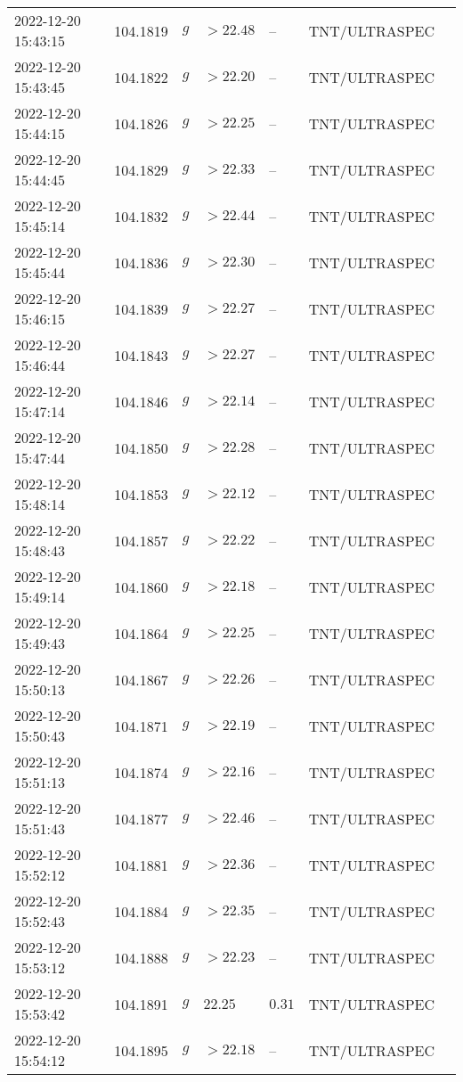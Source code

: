 \documentclass{nature_plusfigure}
\begin{document}
\begin{supplement}
\begin{center}
\begin{longtable}{lllllll}
2022-12-20 15:43:15 & 104.1819 & $g$ & $>22.48$ & -- & TNT/ULTRASPEC &  \\ 
2022-12-20 15:43:45 & 104.1822 & $g$ & $>22.20$ & -- & TNT/ULTRASPEC &  \\ 
2022-12-20 15:44:15 & 104.1826 & $g$ & $>22.25$ & -- & TNT/ULTRASPEC &  \\ 
2022-12-20 15:44:45 & 104.1829 & $g$ & $>22.33$ & -- & TNT/ULTRASPEC &  \\ 
2022-12-20 15:45:14 & 104.1832 & $g$ & $>22.44$ & -- & TNT/ULTRASPEC &  \\ 
2022-12-20 15:45:44 & 104.1836 & $g$ & $>22.30$ & -- & TNT/ULTRASPEC &  \\ 
2022-12-20 15:46:15 & 104.1839 & $g$ & $>22.27$ & -- & TNT/ULTRASPEC &  \\ 
2022-12-20 15:46:44 & 104.1843 & $g$ & $>22.27$ & -- & TNT/ULTRASPEC &  \\ 
2022-12-20 15:47:14 & 104.1846 & $g$ & $>22.14$ & -- & TNT/ULTRASPEC &  \\ 
2022-12-20 15:47:44 & 104.1850 & $g$ & $>22.28$ & -- & TNT/ULTRASPEC &  \\ 
2022-12-20 15:48:14 & 104.1853 & $g$ & $>22.12$ & -- & TNT/ULTRASPEC &  \\ 
2022-12-20 15:48:43 & 104.1857 & $g$ & $>22.22$ & -- & TNT/ULTRASPEC &  \\ 
2022-12-20 15:49:14 & 104.1860 & $g$ & $>22.18$ & -- & TNT/ULTRASPEC &  \\ 
2022-12-20 15:49:43 & 104.1864 & $g$ & $>22.25$ & -- & TNT/ULTRASPEC &  \\ 
2022-12-20 15:50:13 & 104.1867 & $g$ & $>22.26$ & -- & TNT/ULTRASPEC &  \\ 
2022-12-20 15:50:43 & 104.1871 & $g$ & $>22.19$ & -- & TNT/ULTRASPEC &  \\ 
2022-12-20 15:51:13 & 104.1874 & $g$ & $>22.16$ & -- & TNT/ULTRASPEC &  \\ 
2022-12-20 15:51:43 & 104.1877 & $g$ & $>22.46$ & -- & TNT/ULTRASPEC &  \\ 
2022-12-20 15:52:12 & 104.1881 & $g$ & $>22.36$ & -- & TNT/ULTRASPEC &  \\ 
2022-12-20 15:52:43 & 104.1884 & $g$ & $>22.35$ & -- & TNT/ULTRASPEC &  \\ 
2022-12-20 15:53:12 & 104.1888 & $g$ & $>22.23$ & -- & TNT/ULTRASPEC &  \\ 
2022-12-20 15:53:42 & 104.1891 & $g$ & $22.25$ & $0.31$ & TNT/ULTRASPEC &  \\ 
2022-12-20 15:54:12 & 104.1895 & $g$ & $>22.18$ & -- & TNT/ULTRASPEC &  \\ 

\end{longtable}
\end{center}
\end{supplement}
\end{document}
